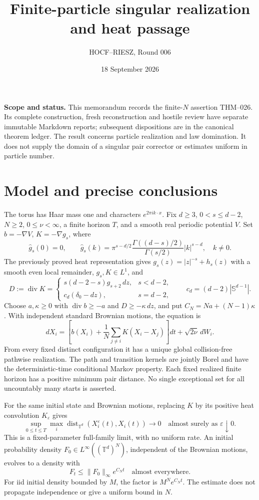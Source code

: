 \documentclass[10pt]{article}
\title{Finite-particle singular realization and heat passage}
\author{HOCF--RIESZ, Round 006}
\date{18 September 2026}
\newcommand{\T}{\mathbb T}
\begin{document}
\maketitle
\noindent\textbf{Scope and status.}
This memorandum records the finite-$N$ assertion THM--026. Its complete
construction, fresh reconstruction and hostile review have separate immutable
Markdown reports; subsequent dispositions are in the canonical theorem ledger.
The result concerns particle realization and law domination. It does not supply
the domain of a singular pair corrector or estimates uniform in particle number.

\section*{Model and precise conclusions}
The torus has Haar mass one and characters $e^{2\pi i k\cdot x}$. Fix
$d\ge3$, $0<s\le d-2$, $N\ge2$, $0\le\nu<\infty$, a finite horizon $T$,
and a smooth real periodic potential $V$. Set $b=-\nabla V$, $K=-\nabla g_s$,
where
\[
 \widehat g_s(0)=0,\qquad
 \widehat g_s(k)=\pi^{s-d/2}
 \frac{\Gamma((d-s)/2)}{\Gamma(s/2)}|k|^{s-d},\quad k\ne0.
\]
The previously proved heat representation gives $g_s(z)=|z|^{-s}+h_s(z)$
with a smooth even local remainder, $g_s,K\in L^1$, and
\[
 D:=\operatorname{div}K=
 \begin{cases}
 s(d-2-s)g_{s+2}\,dz,&s<d-2,\\
 c_d(\delta_0-dz),&s=d-2,
 \end{cases}
 \qquad c_d=(d-2)|\mathbb S^{d-1}|.
\]
Choose $a,\kappa\ge0$ with $\operatorname{div}b\ge-a$ and
$D\ge-\kappa\,dz$, and put $C_N=Na+(N-1)\kappa$.
With independent standard Brownian motions, the equation is
\[
 dX_i=\left[b(X_i)+\frac1N\sum_{j\ne i}K(X_i-X_j)\right]dt
       +\sqrt{2\nu}\,dW_i.
\]
From every fixed distinct configuration it has a unique global collision-free
pathwise realization. The path and transition kernels are jointly Borel and
have the deterministic-time conditional Markov property. Each fixed realized
finite horizon has a positive minimum pair distance. No single exceptional
set for all uncountably many starts is asserted.

For the same initial state and Brownian motions, replacing $K$ by its positive
heat convolution $K_\varepsilon$ gives
\[
 \sup_{0\le t\le T}\max_i
 \operatorname{dist}_{\T^d}(X_i^\varepsilon(t),X_i(t))\longrightarrow0
 \quad\text{almost surely as }\varepsilon\downarrow0.
\]
This is a fixed-parameter full-family limit, with no uniform rate. An initial
probability density $F_0\in L^\infty((\T^d)^N)$, independent of the Brownian
motions, evolves to a density with
\[
 F_t\le\|F_0\|_\infty e^{C_Nt}\quad\text{almost everywhere}.
\]
For iid initial density bounded by $M$, the factor is $M^Ne^{C_Nt}$.
The estimate does not propagate independence or give a uniform bound in $N$.
\end{document}
